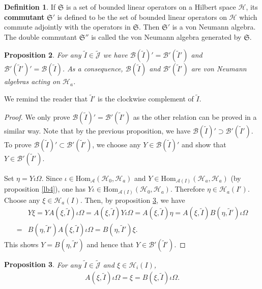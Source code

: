 \documentclass[12pt,a4paper]{article}
\theoremstyle{definition}
\newtheorem{df}{Definition}[section]
\theoremstyle{plain}
\newtheorem{pp}[df]{Proposition}
\newcommand{\fk}{\mathfrak}
\newcommand{\mc}{\mathcal}
\newcommand{\wtd}{\widetilde}
\newcommand{\Hom}{\mathrm{Hom}}
\newcommand{\Jtd}{\widetilde{\mathcal J}}
\numberwithin{equation}{section}
\begin{document}
\begin{df}
If $\fk S$ is a set of bounded linear operators on a Hilbert space $\mc H$, its \textbf{commutant} $\fk S'$ is defined to be the set of bounded linear operators on $\mc H$ which commute adjointly with the  operators in $\fk S$. Then $\fk S'$ is a von Neumann algebra. The double commutant $\fk S''$ is called the von Neumann algebra generated by $\fk S$.
\end{df}

\begin{pp}\label{lb39}
For any $\wtd I\in\Jtd$ we have $\mc B(\wtd I)'=\mc B'(\wtd I')$ and $\mc B'(\wtd I')'=\mc B(\wtd I)$. As a consequence, $\mc B(\wtd I)$ and $\mc B'(\wtd I')$ are von Neumann algebras acting on $\mc H_a$.
\end{pp}
We remind the reader that $\wtd I'$ is the clockwise complement of $\wtd I$.
\begin{proof}
We only prove $\mc B(\wtd I)'=\mc B'(\wtd I')$ as the other relation can be proved in a similar way. Note that by the previous proposition, we have $\mc B(\wtd I)'\supset\mc B'(\wtd I')$. To prove $\mc B(\wtd I)'\subset\mc B'(\wtd I')$, we choose any $Y\in\mc B(\wtd I)'$ and show that $Y\in\mc B'(\wtd I')$.

Set $\eta=Y\iota\Omega$. Since $\iota\in\Hom_{\mc A}(\mc H_0,\mc H_a)$ and  $Y\in\Hom_{\mc A(I)}(\mc H_a,\mc H_a)$ (by proposition \ref{lb4}), one has $Y\iota\in\Hom_{\mc A(I)}(\mc H_0,\mc H_a)$. Therefore $\eta\in\mc H_a(I')$.  Choose any $\xi\in\mc H_a(I)$. Then, by proposition \ref{lb3}, we have
\begin{align*}
&Y\xi=YA(\xi,\wtd I)\iota\Omega=A(\xi,\wtd I)Y\iota\Omega=A(\xi,\wtd I)\eta=A(\xi,\wtd I)B(\eta,\wtd I')\iota\Omega\\
=&B(\eta,\wtd I')A(\xi,\wtd I)\iota\Omega=B(\eta,\wtd I')\xi.
\end{align*}
This shows $Y=B(\eta,\wtd I')$ and hence that $Y\in\mc B'(\wtd I')$.
\end{proof}




\begin{pp}\label{lb3}
For any $\wtd I\in\Jtd$ and $\xi\in\mc H_i(I)$,
\begin{align}
A(\xi,\wtd I)\iota\Omega=\xi=B(\xi,\wtd I)\iota\Omega.\label{eq38}
\end{align}
\end{pp}
\end{document}
